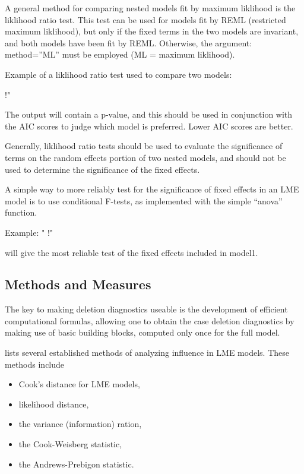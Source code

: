 \documentclass[Chap5amain.tex]{subfiles}
\begin{document}
\newpage




A general method for comparing nested models fit by maximum liklihood is the liklihood ratio 
test. This test can be used for models fit by REML (restricted maximum liklihood), but only if the 
fixed terms in the two models are invariant, and both models have been fit by REML. Otherwise, 
the argument: method=”ML” must be employed (ML = maximum liklihood). 

Example of a liklihood ratio test used to compare two models: 

!"%

The output will contain a p-value, and this should be used in conjunction with the AIC scores to 
judge which model is preferred. Lower AIC scores are better. 

Generally, liklihood ratio tests should be used to evaluate the significance of terms on the 
random effects portion of two nested models, and should not be used to determine the 
significance of the fixed effects. 

A simple way to more reliably test for the significance of fixed effects in an LME model is to use 
conditional F-tests, as implemented with the simple “anova” function. 

Example: 
"
!"%

will give the most reliable test of the fixed effects included in model1. 





\subsection{Methods and Measures}
The key to making deletion diagnostics useable is the development of efficient computational formulas, allowing one to obtain the  case deletion diagnostics by making use of basic building blocks, computed only once for the full model.


\citet{Zewotir} lists several established methods of analyzing influence in LME models. These methods include \begin{itemize}
	\item Cook's distance for LME models,
	\item {} likelihood distance,
	\item the variance (information) ration,
	\item the  Cook-Weisberg statistic,
	\item the  Andrews-Prebigon statistic.
\end{itemize}
\end{document}
